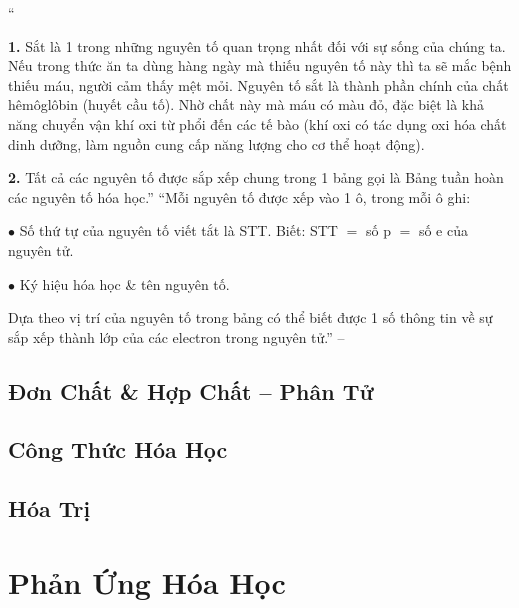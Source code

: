 \documentclass{article}
\numberwithin{equation}{section}
\begin{document}
``\begin{enumerate*}
	\item[\textbf{1.}] Sắt là 1 trong những nguyên tố quan trọng nhất đối với sự sống của chúng ta. Nếu trong thức ăn ta dùng hàng ngày mà thiếu nguyên tố này thì ta sẽ mắc bệnh thiếu máu, người cảm thấy mệt mỏi. Nguyên tố sắt là thành phần chính của chất hêmôglôbin (huyết cầu tố). Nhờ chất này mà máu có màu đỏ, đặc biệt là khả năng chuyển vận khí oxi từ phổi đến các tế bào (khí oxi có tác dụng oxi hóa chất dinh dưỡng, làm nguồn cung cấp năng lượng cho cơ thể hoạt động).
	\item[\textbf{2.}] Tất cả các nguyên tố được sắp xếp chung trong 1 bảng gọi là Bảng tuần hoàn các nguyên tố hóa học.'' ``Mỗi nguyên tố được xếp vào 1 ô, trong mỗi ô ghi:
	\begin{enumerate*}
		\item[$\bullet$] Số thứ tự của nguyên tố viết tắt là STT. Biết: STT $=$ số p $=$ số e của nguyên tử.
		\item[$\bullet$] Ký hiệu hóa học \& tên nguyên tố.
	\end{enumerate*}	
	Dựa theo vị trí của nguyên tố trong bảng có thể biết được 1 số thông tin về sự sắp xếp thành lớp của các electron trong nguyên tử.'' -- \cite[p. 21]{SGK_Hoa_Hoc_8}
\end{enumerate*}


\subsection{Đơn Chất \& Hợp Chất -- Phân Tử}


\subsection{Công Thức Hóa Học}


\subsection{Hóa Trị}


\section{Phản Ứng Hóa Học}
\end{document}
